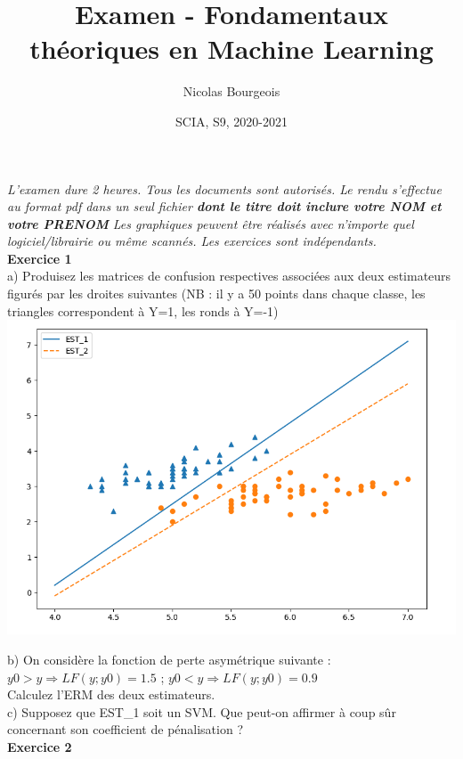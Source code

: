 \documentclass[a4paper]{article}
\title{Examen - Fondamentaux théoriques en Machine Learning}
\author{Nicolas Bourgeois}
\date{SCIA, S9, 2020-2021}
\begin{document}
\maketitle

\textit{L'examen dure 2 heures. Tous les documents sont autorisés. Le rendu s'effectue au format pdf dans un seul fichier \textbf{dont le titre doit inclure votre NOM et votre PRENOM} Les graphiques peuvent être réalisés avec n'importe quel logiciel/librairie ou même scannés. Les exercices sont indépendants.}\\

\textbf{Exercice 1}\\

a) Produisez les matrices de confusion respectives associées aux deux estimateurs figurés par les droites suivantes (NB : il y a 50 points dans chaque classe, les triangles correspondent à Y=1, les ronds à Y=-1)\\

\includegraphics[scale=1]{estimateurs}

b) On considère la fonction de perte asymétrique suivante :\\

$ y0 > y \Rightarrow LF(y; y0) = 1.5$ ; $y0 < y \Rightarrow LF(y; y0) = 0.9 $\\

Calculez l'ERM des deux estimateurs.\\

c) Supposez que EST\_1 soit un SVM. Que peut-on affirmer à coup sûr concernant son coefficient de pénalisation ?\\

\textbf{Exercice 2}\\
\end{document}
